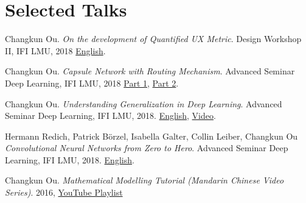 \section{\textbf{Selected Talks}}
 \resumeSubHeadingListStart
    \item{
      Changkun Ou.
      \emph{On the development of Quantified UX Metric}.
      Design Workshop II, IFI LMU, 2018 \href{https://github.com/changkun/talks/blob/master/201805/qux.pdf}{English}.
    }
    \item{
      Changkun Ou.
      \emph{Capsule Network with Routing Mechanism}.
      Advanced Seminar Deep Learning, IFI LMU, 2018 \href{https://github.com/changkun/talks/blob/master/201712/capsnet1.pdf}{Part 1}, \href{https://github.com/changkun/talks/blob/master/201803/capsnet2.pdf}{Part 2}.
    }
    \item{
      Changkun Ou.
      \emph{Understanding Generalization in Deep Learning}.
      Advanced Seminar Deep Learning, IFI LMU, 2018. \href{https://docs.google.com/presentation/d/1eNUYH9_3bbBO7bONPU8BCTr2DOMC69gdOJvBgpLjwNg/edit#slide=id.g2cdf1dbd0b_1_6}{English}, \href{https://www.youtube.com/watch?v=z9je5YlnBgI&t=1585s}{Video}.
    }   
    \item{
      Hermann Redich, Patrick Börzel, Isabella Galter, Collin Leiber, Changkun Ou
      \emph{Convolutional Neural Networks from Zero to Hero}.
      Advanced Seminar Deep Learning, IFI LMU, 2018. \href{https://github.com/changkun/talks/blob/master/201712/cnn.pdf}{English}.
    }
    \item{
        Changkun Ou.
        \emph{Mathematical Modelling Tutorial (Mandarin Chinese Video Series)}.
        2016, \href{https://www.youtube.com/watch?v=EUfXE3vP9_A&list=PLwUqqMt5en7c7iZIseCVAS5BX6RPkS-qR}{YouTube Playlist}
    }
 \resumeSubHeadingListEnd